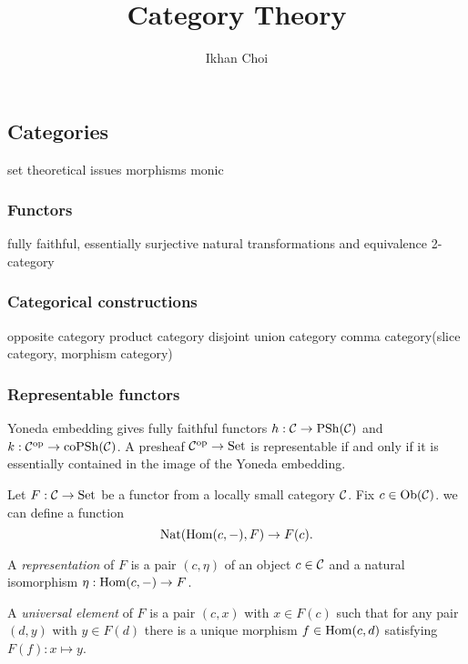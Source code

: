 \documentclass{../../large}
\begin{document}
\title{Category Theory}
\author{Ikhan Choi}
\maketitle
\tableofcontents


\part{}

\chapter{Categories}
set theoretical issues
morphisms
	monic

\section{Functors}
fully faithful, essentially surjective
natural transformations and equivalence
2-category


\section{Categorical constructions}
opposite category
product category
disjoint union category
comma category(slice category, morphism category)


\section{Representable functors}

Yoneda embedding gives fully faithful functors $h:\mathcal{C}\to\mathrm{PSh}(\mathcal{C})$ and $k:\mathcal{C}^{\mathrm{op}}\to\mathrm{coPSh}(\mathcal{C})$.
A presheaf $\mathcal{C}^{\mathrm{op}}\to\mathrm{Set}$ is representable if and only if it is essentially contained in the image of the Yoneda embedding.

\begin{prb}
Let $F:\mathcal{C}\to\mathrm{Set}$ be a functor from a locally small category $\mathcal{C}$.
Fix $c\in\operatorname{Ob}(\mathcal{C})$.
 we can define a function
\[\operatorname{Nat}(\operatorname{Hom}(c,-),F)\to F(c).\]

A \emph{representation} of $F$ is a pair $(c,\eta)$ of an object $c\in\mathcal{C}$ and a natural isomorphism $\eta:\operatorname{Hom}(c,-)\to F$.

A \emph{universal element} of $F$ is a pair $(c,x)$ with $x\in F(c)$ such that for any pair $(d,y)$ with $y\in F(d)$ there is a unique morphism $f\in\operatorname{Hom}(c,d)$ satisfying $F(f):x\mapsto y$.

\begin{parts}
\item
\end{parts}
\end{prb}
\end{document}
